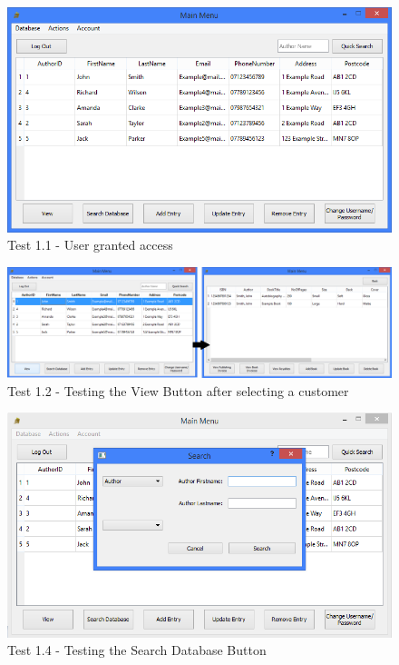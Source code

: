 \begin{landscape}
\begin{figure}[H]
    \includegraphics[width=\textwidth]{./Testing/Evidence/LoginTestSucceed2.png}
    \caption{Test 1.1 - User granted access}  \label{fig:LoginTestSucceed2}
\end{figure}

\begin{figure}[H]
    \includegraphics[width=\textwidth]{./Testing/Evidence/ViewButtonTest.png}
    \caption{Test 1.2 - Testing the View Button after selecting a customer}  \label{fig:ViewButtonTest}
\end{figure}

\begin{figure}[H]
    \includegraphics[width=\textwidth]{./Testing/Evidence/SearchDatabaseButtonTest.png}
    \caption{Test 1.4 - Testing the Search Database Button}  \label{fig:SearchDatabaseButtonTest}
\end{figure}


\end{landscape}
